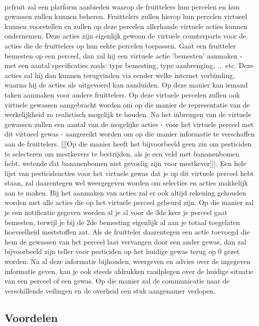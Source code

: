 \paragraph {} pcfruit zal een platform aanbieden waarop de fruittelers hun percelen en hun
gewassen zullen kunnen beheren. Fruittelers zullen hierop hun percelen virtueel kunnen
voorstellen en zullen op deze percelen allerhande virtuele acties kunnen ondernemen. Deze
acties zijn eigenlijk gewoon de virtuele counterparts voor de acties die de fruittelers op hun
echte percelen toepassen. Gaat een fruitteler bemesten op een perceel, dan zal hij een
virtuele actie 'bemesten' aanmaken - met een aantal specificaties zoals: type bemesting,
type aanbrenging, ... etc. Deze acties zal hij dan kunnen terugvinden via eender welke
internet verbinding, waarna hij de acties als uitgevoerd kan aanduiden. Op deze manier kan
iemand taken aanmaken voor andere fruittelers. Op deze virtuele percelen zullen ook
virtuele gewassen aangebracht worden om op die manier de representatie van de
werkelijkheid zo realistisch mogelijk te houden. Na het inbrengen van de virtuele gewassen
zullen een aantal van de mogelijke acties - voor het virtuele perceel met dit virtueel
gewas - aangereikt worden om op die manier informatie te verschaffen aan de fruittelers.
[[[Op die manier heeft het bijvoorbeeld geen zin om pesticiden te selecteren om mestkevers
te bestrijden, als je een veld met bananenbomen hebt, wetende dat bananenbomen niet
gevoelig zijn voor mestkever]]]. Een hele lijst van pesticideacties voor het virtuele
gewas dat je op dit virtuele perceel hebt staan, zal daarentegen wel weergegeven worden om
selecties en acties makkelijk aan te maken. Bij het aanmaken van acties zal er ook altijd
rekening gehouden worden met alle acties die op het virtuele perceel gebeurd zijn. Op die
manier zal je een notificatie gegeven worden al je al voor de 3de keer je perceel gaat
bemesten, terwijl je bij de 2de bemesting eigenlijk al aan je totaal toegelaten
hoeveelheid meststoffen zat. Als de fruitteler daarentegen een actie toevoegd die hem de
gewassen van het perceel laat vervangen door een ander gewas, dan zal bijvoorbeeld zijn
teller voor pesticiden op het huidige gewas terug op 0 gezet worden. Na al deze informatie
bijhouden, weergeven en advies over de ingegeven informatie geven, kan je ook steeds
afdrukken raadplegen over de huidige situatie van een perceel of een gewas. Op die manier
zal de communicatie naar de verschillende veilingen en de overheid een stuk aangenamer
verlopen.


\subsection {Voordelen}

